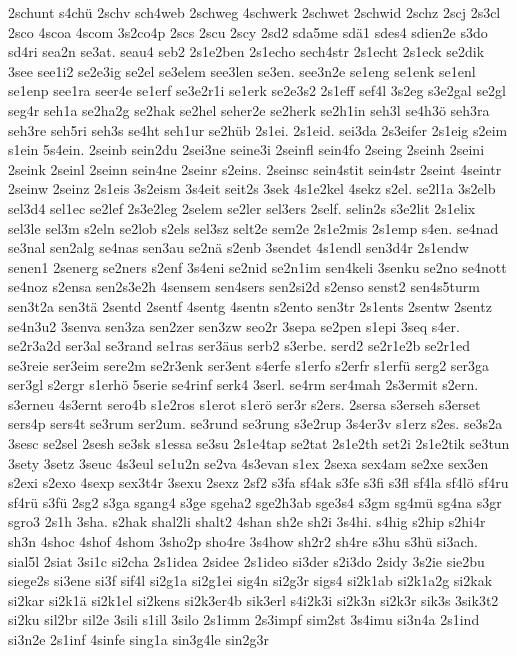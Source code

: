 {2schunt
s4chü
2schv
sch4web
2schweg
4schwerk
2schwet
2schwid
2schz
2scj
2s3cl
2sco
4scoa
4scom
3s2co4p
2scs
2scu
2scy
2sd2
sda5me
sdä1
sdes4
sdien2e
s3do
sd4ri
sea2n
se3at.
seau4
seb2
2s1e2ben
2s1echo
sech4str
2s1echt
2s1eck
se2dik
3see
see1i2
se2e3ig
se2el
se3elem
see3len
se3en.
see3n2e
se1eng
se1enk
se1enl
se1enp
see1ra
seer4e
se1erf
se3e2r1i
se1erk
se2e3s2
2s1eff
sef4l
3s2eg
s3e2gal
se2gl
seg4r
seh1a
se2ha2g
se2hak
se2hel
seher2e
se2herk
se2h1in
seh3l
se4h3ö
seh3ra
seh3re
seh5ri
seh3s
se4ht
seh1ur
se2hüb
2s1ei.
2s1eid.
sei3da
2s3eifer
2s1eig
s2eim
s1ein
5s4ein.
2seinb
sein2du
2sei3ne
seine3i
2seinfl
sein4fo
2seing
2seinh
2seini
2seink
2seinl
2seinn
sein4ne
2seinr
s2eins.
2seinsc
sein4stit
sein4str
2seint
4seintr
2seinw
2seinz
2s1eis
3s2eism
3s4eit
seit2s
3sek
4s1e2kel
4sekz
s2el.
se2l1a
3s2elb
sel3d4
sel1ec
se2lef
2s3e2leg
2selem
se2ler
sel3ers
2self.
selin2s
s3e2lit
2s1elix
sel3le
sel3m
s2eln
se2lob
s2els
sel3sz
selt2e
sem2e
2s1e2mis
2s1emp
s4en.
se4nad
se3nal
sen2alg
se4nas
sen3au
se2nä
s2enb
3sendet
4s1endl
sen3d4r
2s1endw
senen1
2senerg
se2ners
s2enf
3s4eni
se2nid
se2n1im
sen4keli
3senku
se2no
se4nott
se4noz
s2ensa
sen2s3e2h
4sensem
sen4sers
sen2si2d
s2enso
senst2
sen4s5turm
sen3t2a
sen3tä
2sentd
2sentf
4sentg
4sentn
s2ento
sen3tr
2s1ents
2sentw
2sentz
se4n3u2
3senva
sen3za
sen2zer
sen3zw
seo2r
3sepa
se2pen
s1epi
3seq
s4er.
se2r3a2d
ser3al
se3rand
se1ras
ser3äus
serb2
s3erbe.
serd2
se2r1e2b
se2r1ed
se3reie
ser3eim
sere2m
se2r3enk
ser3ent
s4erfe
s1erfo
s2erfr
s1erfü
serg2
ser3ga
ser3gl
s2ergr
s1erhö
5serie
se4rinf
serk4
3serl.
se4rm
ser4mah
2s3ermit
s2ern.
s3erneu
4s3ernt
sero4b
s1e2ros
s1erot
s1erö
ser3r
s2ers.
2sersa
s3erseh
s3erset
sers4p
sers4t
se3rum
ser2um.
se3rund
se3rung
s3e2rup
3s4er3v
s1erz
s2es.
se3s2a
3sesc
se2sel
2sesh
se3sk
s1essa
se3su
2s1e4tap
se2tat
2s1e2th
set2i
2s1e2tik
se3tun
3sety
3setz
3seuc
4s3eul
se1u2n
se2va
4s3evan
s1ex
2sexa
sex4am
se2xe
sex3en
s2exi
s2exo
4sexp
sex3t4r
3sexu
2sexz
2sf2
s3fa
sf4ak
s3fe
s3fi
s3fl
sf4la
sf4lö
sf4ru
sf4rü
s3fü
2sg2
s3ga
sgang4
s3ge
sgeha2
sge2h3ab
sge3s4
s3gm
sg4mü
sg4na
s3gr
sgro3
2s1h
3sha.
s2hak
shal2li
shalt2
4shan
sh2e
sh2i
3s4hi.
s4hig
s2hip
s2hi4r
sh3n
4shoc
4shof
4shom
3sho2p
sho4re
3s4how
sh2r2
sh4re
s3hu
s3hü
si3ach.
sial5l
2siat
3si1c
si2cha
2s1idea
2sidee
2s1ideo
si3der
s2i3do
2sidy
3s2ie
sie2bu
siege2s
si3ene
si3f
sif4l
si2g1a
si2g1ei
sig4n
si2g3r
sigs4
si2k1ab
si2k1a2g
si2kak
si2kar
si2k1ä
si2k1el
si2kens
si2k3er4b
sik3erl
s4i2k3i
si2k3n
si2k3r
sik3s
3sik3t2
si2ku
sil2br
sil2e
3sili
s1ill
3silo
2s1imm
2s3impf
sim2st
3s4imu
si3n4a
2s1ind
si3n2e
2s1inf
4sinfe
sing1a
sin3g4le
sin2g3r
}
